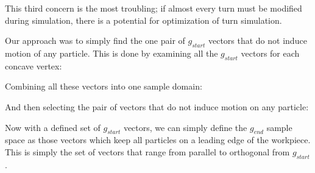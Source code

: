 This third concern is the most troubling; if almost every turn must be modified during simulation, there is a potential for optimization of turn simulation.

Our approach was to simply find the one pair of $g_{start}$ vectors that do not induce motion of any particle. This is done by examining all the $g_{start}$ vectors for each concave vertex:


Combining all these vectors into one sample domain:


And then selecting the pair of vectors that do not induce motion on any particle:


Now with a defined set of $g_{start}$ vectors, we can simply define the $g_{end}$ sample space as those vectors which keep all particles on a leading edge of the workpiece. This is simply the set of vectors that range from parallel to orthogonal from $g_{start}$.


